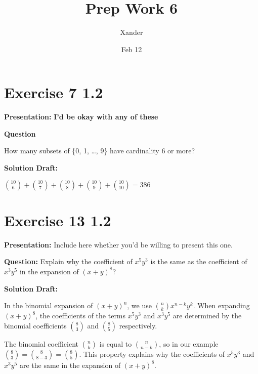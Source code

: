 \documentclass{article}
\title{Prep Work 6}
\author{Xander}
\date{Feb 12}
\begin{document}
\maketitle



\section*{Exercise 7 1.2}  

\noindent\textbf{Presentation:} \textbf{I'd be okay with any of these}

\vspace{0.5cm} %

\noindent\textbf{Question}

How many subsets of \{0, 1, \ldots, 9\} have cardinality 6 or more?

\noindent\textbf{Solution Draft:} 
\vspace{0.2cm}

$\binom{10}{6} + \binom{10}{7} + \binom{10}{8} + \binom{10}{9} + \binom{10}{10} = 386$


\section*{Exercise 13 1.2}  

\noindent\textbf{Presentation:} Include here whether you'd be willing to present this one. 

\vspace{0.5cm} %
\noindent\textbf{Question:} 
Explain why the coefficient of $ x^5y^3 $ is the same as the coefficient of $ x^3y^5 $ in the expansion of $ {(x + y)}^8 $?

\noindent\textbf{Solution Draft:} 

In the binomial expansion of $ {(x + y)}^n $, we use $ \binom{n}{k} x^{n-k}y^k $. When expanding $ {(x + y)}^{8} $, the coefficients of the terms $ x^5y^3 $ and $ x^3y^5 $ are determined by the binomial coefficients $ \binom{8}{3} $ and $ \binom{8}{5} $ respectively.

The binomial coefficient $ \binom{n}{k} $ is equal to $ \binom{n}{n-k} $, so in our example $ \binom{8}{3} = \binom{8}{8-3} = \binom{8}{5} $. This property explains why the coefficients of $ x^5y^3 $ and $ x^3y^5 $ are the same in the expansion of $ {(x + y)}^8 $.


\end{document}
